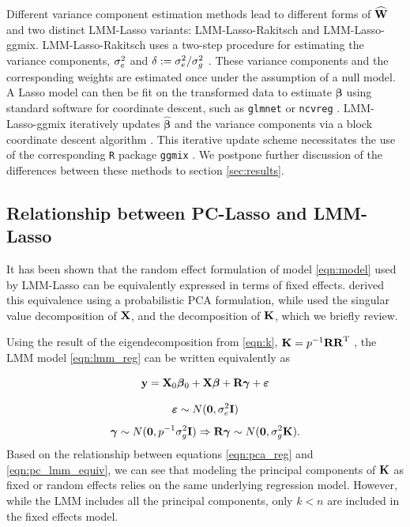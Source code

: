 Different variance component estimation methods lead to different forms of $\widehat{\textbf{W}}$ and two distinct LMM-Lasso variants: LMM-Lasso-Rakitsch and LMM-Lasso-ggmix. LMM-Lasso-Rakitsch uses a two-step procedure for estimating the variance components, $\sigma^2_e$ and $\delta := \sigma^2_e / \sigma^2_g$ \citep{Rakitsch2012}. These variance components and the corresponding weights are estimated once under the assumption of a null model. A Lasso model can then be fit on the transformed data to estimate $\boldsymbol{\beta}$ using standard software for coordinate descent, such as \texttt{glmnet} \citep{glmnet} or \texttt{ncvreg} \citep{ncvreg}. LMM-Lasso-ggmix iteratively updates $\widehat{\boldsymbol{\beta}}$ and the variance components via a block coordinate descent algorithm \citep{bhatnagar2019simultaneous}. This iterative update scheme necessitates the use of the corresponding \texttt{R} package \texttt{ggmix} \citep{ggmix}. We postpone further discussion of the differences between these methods to section \ref{sec:results}.



\subsection{Relationship between PC-Lasso and LMM-Lasso}

It has been shown that the random effect formulation of model \eqref{eqn:model} used by LMM-Lasso can be equivalently expressed in terms of fixed effects. \citet{zhang2015principal} derived this equivalence using a probabilistic PCA formulation, while \citet{hoffman2013correcting} used the singular value decomposition of $\textbf{X}$, and the decomposition of $\textbf{K}$, which we briefly review.

Using the result of the eigendecomposition from \eqref{eqn:k}, $\textbf{K} = p^{-1} \textbf{R} \textbf{R}^{\text{T}}$ , the LMM model \eqref{eqn:lmm_reg} can be written equivalently as

\begin{equation}
    \label{eqn:pc_lmm_equiv}
    \textbf{y} = \textbf{X}_0 \boldsymbol{\beta}{}_0 + \textbf{X} \boldsymbol{\beta}{} + \textbf{R} \boldsymbol{\gamma} + \boldsymbol{\varepsilon}{}
\end{equation}

$$ \boldsymbol{\varepsilon}{} \sim N(\boldsymbol{0}, \sigma^2_e \textbf{I}) $$
$$ \boldsymbol{\gamma} \sim N(\boldsymbol{0}, p^{-1} \sigma^2_g \textbf{I}) \Rightarrow \textbf{R} \boldsymbol{\gamma} \sim N(\boldsymbol{0}, \sigma^2_g \textbf{K}).$$
Based on the relationship between equations \eqref{eqn:pca_reg} and \eqref{eqn:pc_lmm_equiv}, we can see that modeling the principal components of $\textbf{K}$ as fixed or random effects relies on the same underlying regression model. However, while the LMM includes all the principal components, only $k < n$ are included in the fixed effects model. 

